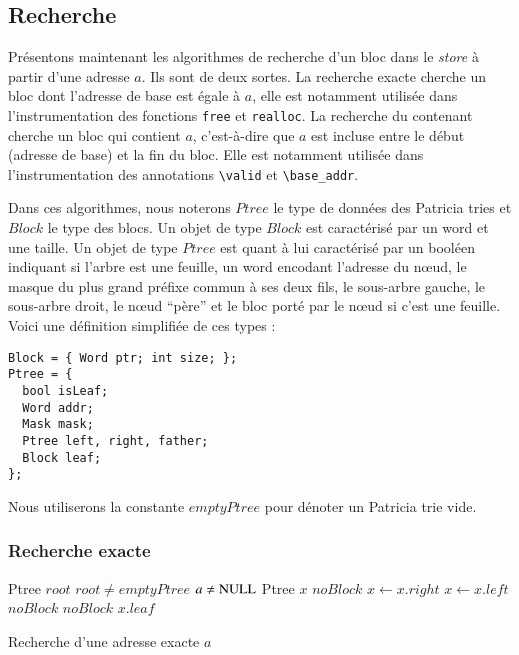 \subsection{Recherche}


Présentons maintenant les algorithmes de recherche d'un bloc dans le
\textit{store} à partir d'une adresse $a$.
Ils sont de deux sortes.
La recherche exacte cherche un bloc dont l'adresse de base est égale à $a$, elle
est notamment utilisée dans l'instrumentation des fonctions \lstinline'free' et
\lstinline'realloc'.
La recherche du contenant cherche un bloc qui contient $a$, c'est-à-dire que
$a$ est incluse entre le début (adresse de base) et la fin du bloc.
Elle est notamment utilisée dans l'instrumentation des annotations
\lstinline'\valid' et \lstinline'\base_addr'.


Dans ces algorithmes, nous noterons $Ptree$ le type de données des Patricia
tries et $Block$ le type des blocs.
Un objet de type $Block$ est caractérisé par un word et une taille.
Un objet de type $Ptree$ est quant à lui caractérisé par un booléen indiquant
si l'arbre est une feuille, un word encodant l'adresse du n\oe{}ud, le masque
du plus grand préfixe commun à ses deux fils, le sous-arbre gauche, le
sous-arbre droit, le n\oe{}ud ``père'' et le bloc porté par le n\oe{}ud si c'est
une feuille.
Voici une définition simplifiée de ces types :

\begin{lstlisting}
Block = { Word ptr; int size; };
Ptree = {
  bool isLeaf;
  Word addr;
  Mask mask;
  Ptree left, right, father;
  Block leaf;
};
\end{lstlisting}
Nous utiliserons la constante $emptyPtree$ pour dénoter un Patricia trie vide.



\subsubsection*{Recherche exacte}


\begin{algorithm}
\begin{algorithmic}[1]
\Statex Ptree $root$
\Statex
\Require $root \neq emptyPtree$
\Require $a \neq \mnull$
\Statex
{}
\State Ptree $x$
    \Return $noBlock$
  \EndIf
    \State $x \gets \mathit{x.right}$
    \State $x \gets \mathit{x.left}$
  \Else
    \Return $noBlock$
  \EndIf
\EndWhile
{}
  \Return $noBlock$
\EndIf
\Return $\mathit{x.leaf}$
\EndFunction
\end{algorithmic}
\caption{Recherche d'une adresse exacte $a$
  \label{algo:get-exact}}
\end{algorithm}


